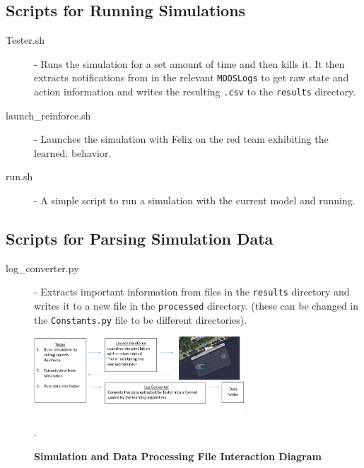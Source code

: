 \documentclass[onecolumn,letterpaper,11pt]{article}
\begin{document}
\subsection{Scripts for Running Simulations}
\begin{description}
	\item[Tester.sh] - Runs the simulation for a set amount of time and then kills it. It then extracts notifications from  in the relevant \texttt{MOOSLogs} to get raw state and action information and writes the resulting \texttt{.csv} to the \texttt{results} directory.
	
	\item[launch\_reinforce.sh] - Launches the simulation with Felix on the red team exhibiting the learned. behavior.
	
	\item[run.sh] - A simple script to run a simulation with the current model and  running.	
\end{description}  


\subsection{Scripts for Parsing Simulation Data}
\begin{description}
	\item[log\_converter.py] - Extracts important information from files in the \texttt{results} directory and writes it to a new file in the \texttt{processed} directory. (these can be changed in the \texttt{Constants.py} file to be different directories).
\end{description}

\begin{figure}[H]
	\centering 
	\includegraphics[width=0.7\textwidth]{../images/SimulationInteractionDiagram.png}
	\caption{{\bf Simulation and Data Processing File Interaction Diagram}}.
	\label{fig_sim_diagram}
\end{figure}

\vspace{0.1in}


\end{document}
